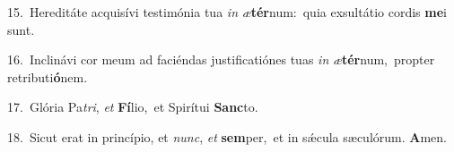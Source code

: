 {\numbfont\textcolor{\numbcolor}{15.}}~Hereditáte acquisívi testimónia tua \textit{in} \textit{æ}\-\textbf{tér}num:~\star quia exsultátio cordis \textbf{me}\-i sunt.\par
{\numbfont\textcolor{\numbcolor}{16.}}~Inclinávi cor meum ad faciéndas justificatiónes tuas \textit{in} \textit{æ}\-\textbf{tér}num,~\star propter retributi\-\textbf{ó}\-nem.\par
{\numbfont\textcolor{\numbcolor}{17.}}~Glória Pa\-\textit{tri}\-, \textit{et} \textbf{Fí}\-lio,~\star et Spirítui \textbf{Sanc}\-to.\par
{\numbfont\textcolor{\numbcolor}{18.}}~Sicut erat in princípio, et \textit{nunc}\-, \textit{et} \textbf{sem}\-per,~\star et in sǽcula sæculórum. \textbf{A}\-men.\par

